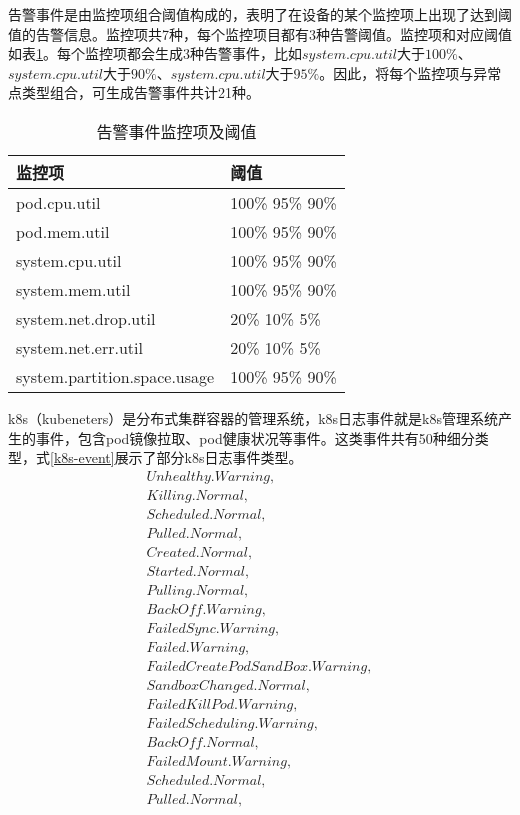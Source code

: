 告警事件是由监控项组合阈值构成的，表明了在设备的某个监控项上出现了达到阈值的告警信息。监控项共7种，每个监控项目都有3种告警阈值。监控项和对应阈值如表\ref{alarm-event}。每个监控项都会生成3种告警事件，比如$system.cpu.util$大于$100\%$、$system.cpu.util$大于$90\%$、$system.cpu.util$大于$95\%$。因此，将每个监控项与异常点类型组合，可生成告警事件共计21种。
\begin{table}[]
    \centering
    \caption{告警事件监控项及阈值}
    \label{alarm-event}
    \begin{tabular}{ll}
    \hline
    监控项                          & 阈值              \\ \hline
    pod.cpu.util                 & 100\% 95\% 90\% \\
    pod.mem.util                 & 100\% 95\% 90\% \\
    system.cpu.util              & 100\% 95\% 90\% \\
    system.mem.util              & 100\% 95\% 90\% \\
    system.net.drop.util         & 20\% 10\% 5\%   \\
    system.net.err.util          & 20\% 10\% 5\%   \\
    system.partition.space.usage & 100\% 95\% 90\% \\ \hline
    \end{tabular}
    \end{table}

k8s（kubeneters）是分布式集群容器的管理系统，k8s日志事件就是k8s管理系统产生的事件，包含pod镜像拉取、pod健康状况等事件。这类事件共有50种细分类型，式\ref{k8s-event}展示了部分k8s日志事件类型。
\begin{equation}
    \begin{array}{l}
        Unhealthy.Warning, \\
        Killing.Normal,\\
        Scheduled.Normal,\\
        Pulled.Normal,\\
        Created.Normal,\\
        Started.Normal,\\
        Pulling.Normal,\\
        BackOff.Warning,\\
        FailedSync.Warning,\\
        Failed.Warning,\\
        FailedCreatePodSandBox.Warning,\\
        SandboxChanged.Normal,\\
        FailedKillPod.Warning,\\
        FailedScheduling.Warning,\\
        BackOff.Normal,\\
        FailedMount.Warning,\\ 
        Scheduled.Normal,\\
        Pulled.Normal,\\
    \end{array}
    \label{k8s-event}
\end{equation}

